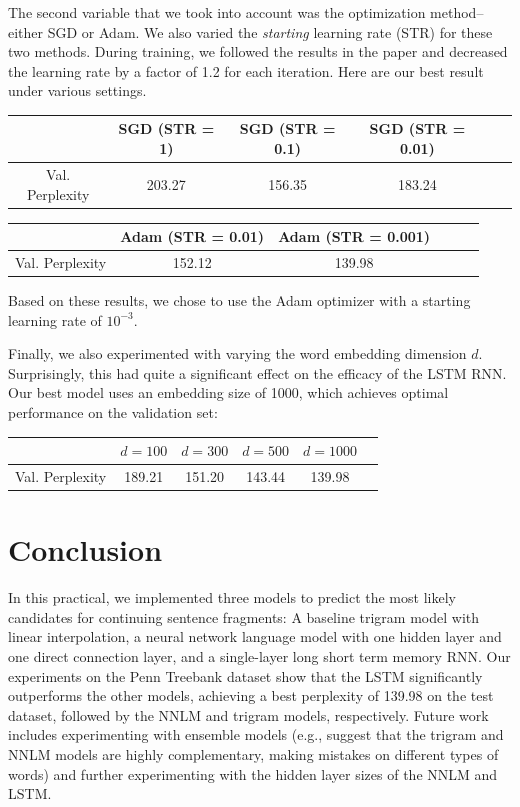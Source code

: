 \documentclass[11pt]{article}
\begin{document}
The second variable that we took into account was the optimization method--either SGD or Adam.  We also varied the \emph{starting} learning rate (STR) for these two methods.  During training, we followed the results in the paper and decreased the learning rate by a factor of 1.2 for each iteration.  Here are our best result under various settings.     

\begin{center}
	\begin{tabular}{ c | c c c c c}
		 & SGD (STR = 1) & SGD (STR = 0.1) & SGD (STR = 0.01)  \\
		\hline
		Val. Perplexity & 203.27 & 156.35 & 183.24 
	\end{tabular}
\end{center} 

\begin{center}
	\begin{tabular}{ c | c c c c c}
		 & Adam (STR = 0.01) & Adam (STR = 0.001)  \\
		\hline
		Val. Perplexity & 152.12 & 139.98 
	\end{tabular}
\end{center} 
Based on these results, we chose to use the Adam optimizer with a starting learning rate of $10^{-3}$.  

Finally, we also experimented with varying the word embedding dimension $d$.  Surprisingly, this had quite a significant effect on the efficacy of the LSTM RNN. Our best model uses an embedding size of 1000, which achieves optimal performance on the validation set:
\begin{center}
	\begin{tabular}{ c | c c c c c}
		 & $d = 100$ & $d = 300$ & $d = 500$ &  $d = 1000$  \\
		\hline
		Val. Perplexity & 189.21 & 151.20 & 143.44  & 139.98 
	\end{tabular}
\end{center}    

\section{Conclusion}
In this practical, we implemented three models to predict the most likely candidates for continuing sentence fragments: A baseline trigram model with linear interpolation, a neural network language model with one hidden layer and one direct connection layer, and a single-layer long short term memory RNN. Our experiments on the Penn Treebank dataset show that the LSTM significantly outperforms the other models, achieving a best perplexity of 139.98 on the test dataset, followed by the NNLM and trigram models, respectively. Future work includes experimenting with ensemble models (e.g., \cite{nnlm} suggest that the trigram and NNLM models are highly complementary, making mistakes on different types of words) and further experimenting with the hidden layer sizes of the NNLM and LSTM.



\nocite{*}

\end{document}
